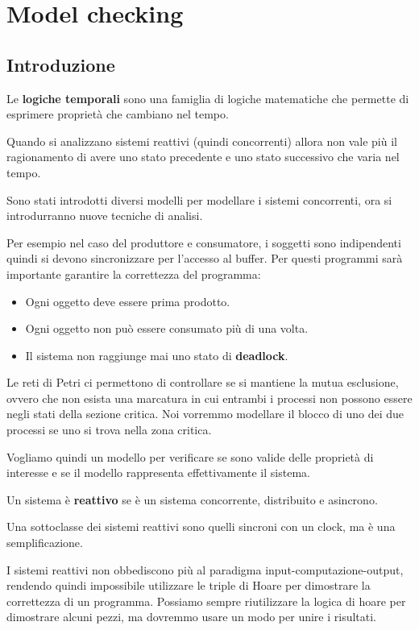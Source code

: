 \chapter{Model checking}
\section{Introduzione}
Le \textbf{logiche temporali} sono una famiglia di logiche matematiche che
permette di esprimere proprietà che cambiano nel tempo.

Quando si analizzano sistemi reattivi (quindi concorrenti) allora non vale più
il ragionamento di avere uno stato precedente e uno stato successivo che varia
nel tempo.

Sono stati introdotti diversi modelli per modellare i sistemi concorrenti, ora
si introdurranno nuove tecniche di analisi.

Per esempio nel caso del produttore e consumatore, i soggetti sono indipendenti
quindi si devono sincronizzare per l'accesso al buffer. Per questi programmi
sarà importante garantire la correttezza del programma:
\begin{itemize}
    \item Ogni oggetto deve essere prima prodotto.
    \item Ogni oggetto non può essere consumato più di una volta.
    \item Il sistema non raggiunge mai uno stato di \textbf{deadlock}.
\end{itemize}
Le reti di Petri ci permettono di controllare se si mantiene la mutua esclusione,
ovvero che non esista una marcatura in cui entrambi i processi non possono essere
negli stati della sezione critica. Noi vorremmo modellare il blocco di uno dei
due processi se uno si trova nella zona critica.

Vogliamo quindi un modello per verificare se sono valide delle proprietà di
interesse e se il modello rappresenta effettivamente il sistema.
\begin{definizione}
    Un sistema è \textbf{reattivo} se è un sistema concorrente, distribuito e
    asincrono.
\end{definizione}
Una sottoclasse dei sistemi reattivi sono quelli sincroni con un clock, ma è una
semplificazione.

I sistemi reattivi non obbediscono più al paradigma input-computazione-output,
rendendo quindi impossibile utilizzare le triple di Hoare per dimostrare la
correttezza di un programma. Possiamo sempre riutilizzare la logica di hoare per
dimostrare alcuni pezzi, ma dovremmo usare un modo per unire i risultati.

